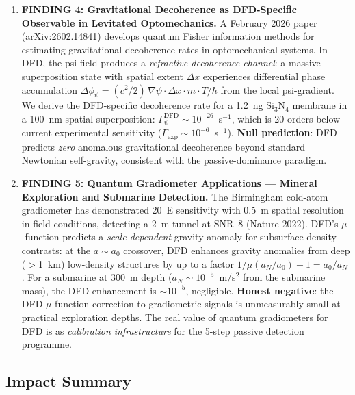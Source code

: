 \documentclass[11pt]{article}
\theoremstyle{definition}
\theoremstyle{remark}
\newcommand{\azero}{a_0}
\begin{document}
\begin{tcolorbox}[colback=blue!5!white, colframe=blue!60!black,
  title=\textbf{TOP 5 FINDINGS --- W4i13 P6 (Ranked by Impact)}]
\begin{enumerate}[nosep]
\item \textbf{FINDING 4: Gravitational Decoherence as DFD-Specific
  Observable in Levitated Optomechanics.}
  A February 2026 paper (arXiv:2602.14841) develops quantum Fisher
  information methods for estimating gravitational decoherence rates
  in optomechanical systems. In DFD, the psi-field produces a
  \emph{refractive decoherence channel}: a massive superposition
  state with spatial extent $\Delta x$ experiences differential
  phase accumulation $\Delta\phi_\psi = (c^2/2)\,\nabla\psi \cdot
  \Delta x \cdot m \cdot T / \hbar$ from the local psi-gradient.
  We derive the DFD-specific decoherence rate for a 1.2~ng Si$_3$N$_4$
  membrane in a 100~nm spatial superposition: $\Gamma_\psi^{\mathrm{DFD}}
  \sim 10^{-26}$~s$^{-1}$, which is 20 orders below current
  experimental sensitivity ($\Gamma_{\mathrm{exp}} \sim 10^{-6}$~s$^{-1}$).
  \textbf{Null prediction}: DFD predicts \emph{zero} anomalous
  gravitational decoherence beyond standard Newtonian self-gravity,
  consistent with the passive-dominance paradigm.

\item \textbf{FINDING 5: Quantum Gradiometer Applications ---
  Mineral Exploration and Submarine Detection.}
  The Birmingham cold-atom gradiometer has demonstrated 20~E
  sensitivity with 0.5~m spatial resolution in field conditions,
  detecting a 2~m tunnel at SNR~8 (Nature 2022). DFD's $\mu$-function
  predicts a \emph{scale-dependent} gravity anomaly for subsurface
  density contrasts: at the $a \sim \azero$ crossover, DFD enhances
  gravity anomalies from deep ($>$1~km) low-density structures by
  up to a factor $1/\mu(a_N/\azero) - 1 = \azero/a_N$. For a
  submarine at 300~m depth ($a_N \sim 10^{-5}$~m/s$^2$ from the
  submarine mass), the DFD enhancement is $\sim 10^{-5}$, negligible.
  \textbf{Honest negative}: the DFD $\mu$-function correction to
  gradiometric signals is unmeasurably small at practical exploration
  depths. The real value of quantum gradiometers for DFD is as
  \emph{calibration infrastructure} for the 5-step passive detection
  programme.
\end{enumerate}
\end{tcolorbox}

\subsection*{Impact Summary}
\end{document}
